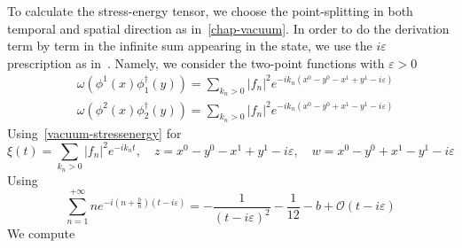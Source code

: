 %
To calculate the stress-energy tensor, we choose the point-splitting in both temporal and spatial direction as in~\cref{chap-vacuum}. 
In order to do the derivation term by term in the infinite sum appearing in the state, we use the $i\varepsilon$ prescription as in~\cite{Zahn2017}. 
Namely, we consider the two-point functions with $\varepsilon >0$
\begin{equation*}
\begin{split}
& \omega(\phi^1(x)\phi_1^\dagger(y)) = 
 \sum_{k_n>0} |f_n|^2 e^{-ik_n(x^0 - y^0 - x^1 + y^1-i\varepsilon)} \\
& \omega(\phi^2(x)\phi_2^\dagger(y)) =
\sum_{k_n>0} |f_n|^2 e^{-ik_n(x^0 - y^0 + x^1 - y^1-i\varepsilon)}
\end{split}
\end{equation*}
%
Using~\cref{vacuum-stressenergy} for 
\begin{equation*}
\xi(t) = \sum_{k_n>0} |f_n|^2 e^{-ik_n t} ,  \quad
z = x^0 - y^0 - x^1 + y^1-i\varepsilon  ,\quad
w = x^0 - y^0 + x^1 - y^1-i\varepsilon
\end{equation*}
Using
\begin{equation*}
\sum_{n=1}^{+\infty} n e^{-i(n+\frac b n )(t - i\varepsilon)}
= -\frac{1}{(t-i\varepsilon)^2} - \frac{1}{12}-b + \mathcal{O}(t-i\varepsilon)
\end{equation*}
We compute
